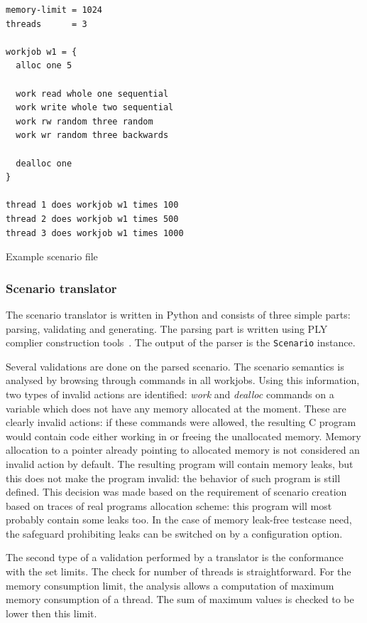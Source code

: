 \begin{table}[h]
\begin{center}
\begin{lstlisting}[frame=single]
memory-limit = 1024
threads      = 3

workjob w1 = {
  alloc one 5

  work read whole one sequential
  work write whole two sequential
  work rw random three random
  work wr random three backwards

  dealloc one
}

thread 1 does workjob w1 times 100
thread 2 does workjob w1 times 500
thread 3 does workjob w1 times 1000
\end{lstlisting}
\caption{Example scenario file}
\label{scenario-sample}
\end{center}
\end{table} 

\subsubsection{Scenario translator}
The scenario translator is written in Python and consists of three simple parts:
parsing, validating and generating. The parsing part is written using PLY
complier construction tools~\cite{python-ply}. The output of the parser is the
{\tt Scenario} instance. 

Several validations are done on the parsed scenario. The scenario semantics is
analysed by browsing through commands in all workjobs. Using this information,
two types of invalid actions are identified: {\em work} and {\em dealloc} 
commands on a variable which does not have any memory allocated at the moment.
These are clearly invalid actions: if these commands were allowed, the resulting
C program would contain code either working in or freeing the unallocated
memory. Memory allocation to a pointer already pointing to allocated memory is
not considered an invalid action by default. The resulting program will contain
memory leaks, but this does not make the program invalid: the behavior of such
program is still defined. This decision was made based on the requirement of
scenario creation based on traces of real programs allocation scheme: this
program will most probably contain some leaks too. In the case of memory
leak-free testcase need, the safeguard prohibiting leaks can be switched on by a
configuration option.

The second type of a validation performed by a translator is the conformance
with the set limits. The check for number of threads is straightforward. For the
memory consumption limit, the analysis allows a computation of maximum memory
consumption of a thread. The sum of maximum values is checked to be lower
then this limit.

